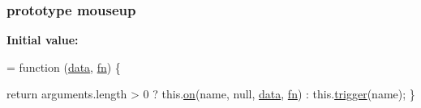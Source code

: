 \subsubsection[{\texorpdfstring{mouseup}{mouseup}}]{ {\bf prototype} mouseup}\hypertarget{jquery-2_82_81-vsdoc_8js_adb45f5bdff2560ba1f3ca44f5332221a}{}\label{jquery-2_82_81-vsdoc_8js_adb45f5bdff2560ba1f3ca44f5332221a}
{\bfseries Initial value\+:}
\begin{DoxyCode}
= \textcolor{keyword}{function} (\hyperlink{jquery-2_82_81-vsdoc_8js_a609407b3456fdc3c5671a9fc4a226ff7}{data}, \hyperlink{jquery-2_82_81-vsdoc_8js_acef6bdaf6b9b20fdcca1ea86f0902c3b}{fn}) \{
        

        \textcolor{keywordflow}{return} arguments.length > 0 ?
            this.\hyperlink{jquery-2_82_81-vsdoc_8js_ae453b412b883f60220d73468ef6c6dbc}{on}(name, null, \hyperlink{jquery-2_82_81-vsdoc_8js_a609407b3456fdc3c5671a9fc4a226ff7}{data}, \hyperlink{jquery-2_82_81-vsdoc_8js_acef6bdaf6b9b20fdcca1ea86f0902c3b}{fn}) :
            this.\hyperlink{jquery-2_82_81-vsdoc_8js_a2388c4114d5e3e4eab020f973641519c}{trigger}(name);
    \}
\end{DoxyCode}

